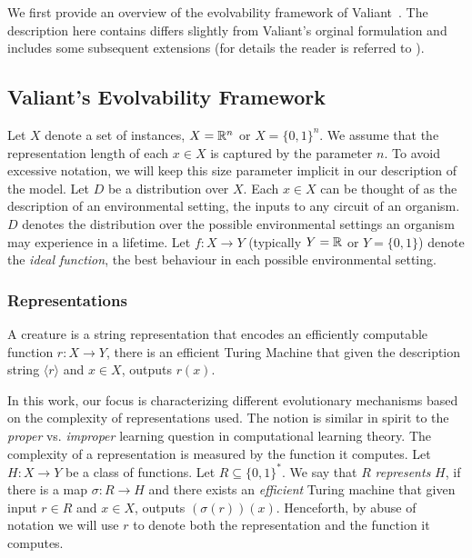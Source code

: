 We first provide an overview of the evolvability framework of
Valiant~\cite{Valiant:2009-evolvability}. The description here contains differs
slightly from Valiant's orginal formulation and includes some subsequent
extensions (for details the reader is referred to
\cite{Valiant:2009-evolvability,Feldman:2008-evolvability,
Feldman:2009-robustness, Valiant:2012-real, Kanade:2012-thesis}).

\subsection{Valiant's Evolvability Framework}

Let $X$ denote a set of instances, \eg $X = \mathbb{R}^n$ or $X = \{0, 1\}^n$. We
assume that the representation length of each $x \in X$ is captured by the
parameter $n$. To avoid excessive notation, we will keep this size parameter
implicit in our description of the model. Let $D$ be a distribution over $X$.
Each $x \in X$ can be thought of as the description of an environmental setting,
the inputs to any circuit of an organism. $D$ denotes the distribution over the
possible environmental settings an organism may experience in a lifetime. Let $f
: X \rightarrow Y$ (typically $Y = \mathbb{R}$ or $Y = \{0, 1\}$) denote the
\emph{ideal function}, the best behaviour in each possible environmental
setting.

\subsubsection*{Representations}

A creature is a string representation that encodes an efficiently computable
function $r : X \rightarrow Y$, \ie there is an efficient Turing Machine that
given the description string $\langle r \rangle$ and $x \in X$, outputs $r(x)$.  

In this work, our focus is characterizing different evolutionary mechanisms
based on the complexity of representations used. The notion is similar in spirit
to the \emph{proper} vs. \emph{improper} learning question in computational
learning theory. The complexity of a representation is measured by the function
it computes.  Let $H : X \rightarrow Y$ be a class of functions. Let $R
\subseteq \{0, 1\}^*$.  We say that $R$ \emph{represents} $H$, if there is a map
$\sigma : R \rightarrow H$ and there exists an \emph{efficient} Turing machine
that given input $r \in R$ and $x \in X$, outputs $(\sigma(r))(x)$. Henceforth,
by abuse of notation we will use $r$ to denote both the representation and the
function it computes.

